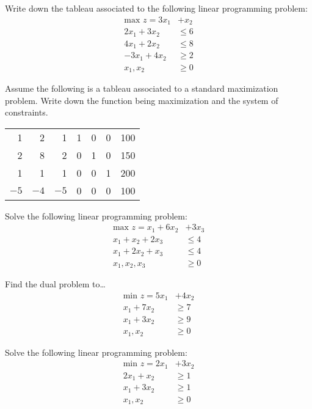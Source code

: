 \documentclass[11pt,letterpaper]{article}
\begin{document}

 Write down the tableau associated to the following linear programming problem:
	\[
	\begin{aligned}
	\text{max }  z= 3x_1 &+ x_2 \\
	2x_1 + 3x_2&\leq 6 \\
	4x_1 + 2x_2&\leq 8 \\
	-3x_1 + 4x_2&\geq 2 \\
	x_1, x_2&\geq 0
	\end{aligned}
	\]



\newpage



 Assume the following is a tableau associated to a standard maximization problem. Write down the function being maximization and the system of constraints. 
	\begin{table}[!ht]
	\centering
	\begin{tabular}{rrrrrr|r}
	1 & 2 & 1 & 1 & 0 & 0 & 100 \\
	2 & 8 & 2 & 0 & 1 & 0 & 150 \\
	1 & 1 & 1 & 0 & 0 & 1 & 200 \\ \hline
	$-5$ & $-4$ & $-5$ & 0 & 0 & 0 & 100
	\end{tabular}
	\end{table}



\newpage



 Solve the following linear programming problem:
	\[
	\begin{aligned}
	\text{max } z= x_1 + 6x_2& + 3x_3 \\
	x_1 + x_2 + 2x_3&\leq 4 \\
	x_1 + 2x_2 + x_3&\leq 4 \\
	x_1, x_2, x_3&\geq 0 
	\end{aligned}
	\]




\newpage




 Find the dual problem to\dots
	\[
	\begin{aligned}
	\text{min } z= 5x_1 &+ 4x_2 \\
	x_1 + 7x_2&\geq 7 \\
	x_1 + 3x_2&\geq 9 \\
	x_1, x_2&\geq 0 
	\end{aligned}
	\]




\newpage



 Solve the following linear programming problem:
	\[
	\begin{aligned}
	\text{min } z= 2x_1 &+ 3x_2 \\
	2x_1 + x_2&\geq 1 \\
	x_1 + 3x_2&\geq 1 \\
	x_1, x_2&\geq 0 
	\end{aligned}
	\]
\end{document}
